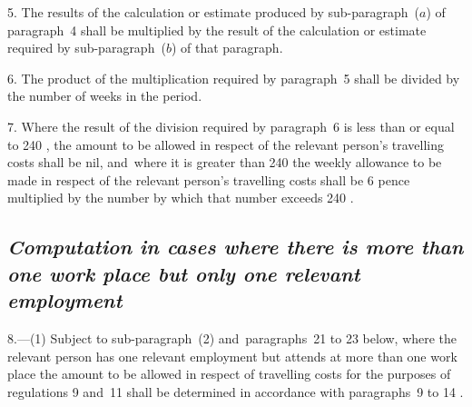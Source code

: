 \documentclass[12pt,a4paper]{article}
\begin{document}

\medskip

5.  The results of the calculation or estimate produced by sub-paragraph~($a$) of paragraph~4 shall be multiplied by the result of the calculation or estimate required by sub-paragraph~($b$) of that paragraph.

\medskip


6.  The product of the multiplication required by paragraph~5 shall be divided by the number of weeks in the period.

\medskip

7.  Where the result of the division required by paragraph~6 is less than or equal to 
240%
, the amount to be allowed in respect of the relevant person’s travelling costs shall be nil, and~where it is greater than 
240  %
the weekly allowance to be made in respect of the relevant person’s travelling costs shall be 
6 pence  %
multiplied by the number by which that number exceeds 
240%
.


\subsection*{\itshape Computation in cases where there is more than one work place but only one relevant employment}

8.—(1) Subject to sub-paragraph~(2) and~paragraphs~21 to 23 below, where the relevant person has one relevant employment but attends at more than one work place the amount to be allowed in respect of travelling costs for the purposes of regulations 9 and~11 shall be determined in accordance with paragraphs~9 to 
14%
.
\end{document}
